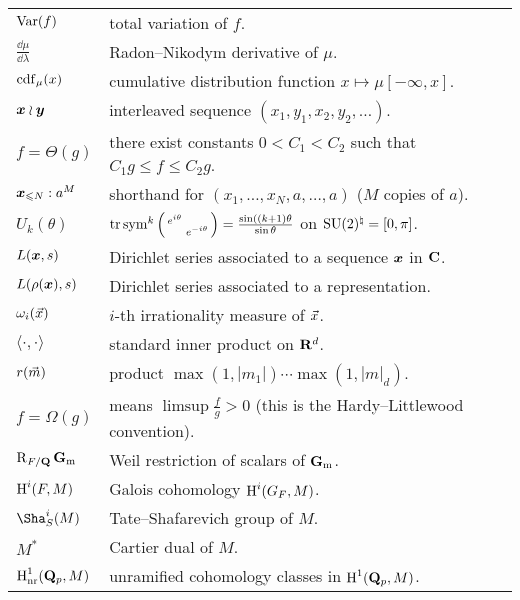 \documentclass[phd,tocprelim]{cornell}
\begin{document}
\begin{tabular}{ll}
$\operatorname{Var}(f)$
	& total variation of $f$. \\
$\frac{\dd\mu}{\dd\lambda}$
	& Radon--Nikodym derivative of $\mu$. \\
$\operatorname{cdf}_\mu(x)$
	& cumulative distribution function $x\mapsto \mu[-\infty,x]$. \\	
${\boldsymbol x}\wr{\boldsymbol y}$
	& interleaved sequence $(x_1,y_1,x_2,y_2,\dots)$. \\
$f = \Theta(g)$
	& there exist constants $0 < C_1 < C_2$ such that $C_1 g \leqslant f \leqslant C_2 g$. \\
${\boldsymbol x}_{\leqslant N} : a^M$
	& shorthand for $(x_1,\dots,x_N,a,\dots,a)$ ($M$ copies of $a$). \\
$U_k(\theta)$
	& $\operatorname{tr}\operatorname{sym}^k\left(\begin{smallmatrix} e^{i\theta} &  \\  & e^{-i\theta} \end{smallmatrix}\right) = \frac{\sin((k+1)\theta}{\sin\theta}$ on $\operatorname{SU}(2)^\natural = [0,\pi]$. \\
$L({\boldsymbol x},s)$
	& Dirichlet series associated to a sequence ${\boldsymbol x}$ in $\mathbf{C}$. \\
$L(\rho({\boldsymbol x}),s)$
	& Dirichlet series associated to a representation. \\
$\omega_i(\vec{x})$
	& $i$-th irrationality measure of $\vec{x}$. \\
$\langle \cdot,\cdot\rangle$
	& standard inner product on $\mathbf{R}^d$. \\
$r(\vec{m})$
	& product $\max(1,|m_1|) \cdots \max(1,|m|_d)$. \\
$f = \Omega(g)$
	& means $\limsup \frac f g > 0$ (this is the Hardy--Littlewood convention). \\
$\operatorname{R}_{F/\mathbf{Q}} \mathbf{G}_\mathrm{m}$
	& Weil restriction of scalars of $\mathbf{G}_\mathrm{m}$. \\
$\operatorname{H}^i(F,M)$
	& Galois cohomology $\operatorname{H}^i(G_F,M)$. \\
$\Sha^i_S(M)$
	& Tate--Shafarevich group of $M$. \\
$M^\ast$
	& Cartier dual of $M$. \\
$\operatorname{H}_{\mathrm{nr}}^1(\mathbf{Q}_p,M)$
	& unramified cohomology classes in $\operatorname{H}^1(\mathbf{Q}_p,M)$. 
\end{tabular}
\newpage





\normalspacing
\setcounter{page}{1}
\pagestyle{cornell}
\addtolength{\parskip}{0.5\baselineskip}

















\end{document}
